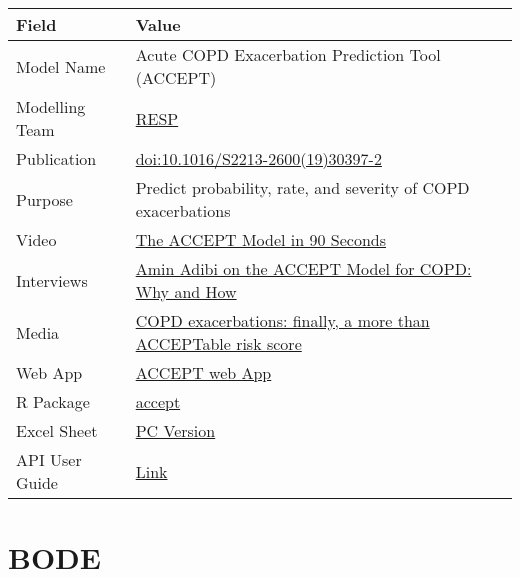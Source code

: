 \documentclass[
]{book}
\begin{document}
\begin{longtable}[]{@{}ll@{}}
\toprule
Field & Value\tabularnewline
\midrule
\endhead
Model Name & Acute COPD Exacerbation Prediction Tool (ACCEPT)\tabularnewline
Modelling Team & \href{http://resp.core.ubc.ca}{RESP}\tabularnewline
Publication & \href{https://doi.org/10.1016/S2213-2600(19)30397-2}{doi:10.1016/S2213-2600(19)30397-2}\tabularnewline
Purpose & Predict probability, rate, and severity of COPD exacerbations\tabularnewline
Video & \href{https://www.peermodelsnetwork.com/educational-videos?wix-vod-video-id=679cbb410686401193779a2931731c56\&wix-vod-comp-id=comp-k8q9lys1}{The ACCEPT Model in 90 Seconds}\tabularnewline
Interviews & \href{https://www.peermodelsnetwork.com/post/amin-adibi-on-the-accept-model-for-copd-why-and-how}{Amin Adibi on the ACCEPT Model for COPD: Why and How}\tabularnewline
Media & \href{https://doi.org/10.1016/S2213-2600(20)30049-7}{COPD exacerbations: finally, a more than ACCEPTable risk score}\tabularnewline
Web App & \href{http://resp.core.ubc.ca/ipress/accept}{ACCEPT web App}\tabularnewline
R Package & \href{https://cran.r-project.org/package=accept}{accept}\tabularnewline
Excel Sheet & \href{https://drive.google.com/uc?export=download\&id=1NNE7pKBVP939tly-6JISaVw-y33m8y28}{PC Version}\tabularnewline
API User Guide & \href{https://resplab.github.io/prismguide/api-users-guide.html\#accept-1}{Link}\tabularnewline
\bottomrule
\end{longtable}

\hypertarget{bode}{%
\chapter{BODE}\label{bode}}
\end{document}
